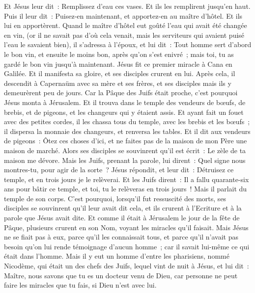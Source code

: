 \begin{multicols}{2}
Et Jésus leur dit~: Remplissez d'eau ces vases. Et ils les remplirent jusqu'en haut.
Puis il leur dit~: Puisez-en maintenant, et apportez-en au maître d'hôtel. Et ils lui en apportèrent.
Quand le maître d'hôtel eut goûté l'eau qui avait été changée en vin, (or il ne savait pas d'où cela venait, mais les serviteurs qui avaient puisé l'eau le savaient bien), il s'adressa à l'époux,
et lui dit~: Tout homme sert d'abord le bon vin, et ensuite le moins bon, après qu'on s'est enivré~; mais toi, tu as gardé le bon vin jusqu'à maintenant.
Jésus fit ce premier miracle à Cana en Galilée. Et il manifesta sa gloire, et ses disciples crurent en lui.
Après cela, il descendit à Capernaüm avec sa mère et ses frères, et ses disciples mais ils y demeurèrent peu de jours.
Car la Pâque des Juifs était proche, c'est pourquoi Jésus monta à Jérusalem.
Et il trouva dans le temple des vendeurs de bœufs, de brebis, et de pigeons, et les changeurs qui y étaient assis.
Et ayant fait un fouet avec des petites cordes, il les chassa tous du temple, avec les brebis et les bœufs~; il dispersa la monnaie des changeurs, et renversa les tables.
Et il dit aux vendeurs de pigeons~: Ôtez ces choses d'ici, et ne faites pas de la maison de mon Père une maison de marché.
Alors ses disciples se souvinrent qu'il est écrit~: Le zèle de ta maison me dévore.
Mais les Juifs, prenant la parole, lui dirent~: Quel signe nous montres-tu, pour agir de la sorte~?
Jésus répondit, et leur dit~: Détruisez ce temple, et en trois jours je le relèverai.
Et les Juifs dirent~: Il a fallu quarante-six ans pour bâtir ce temple, et toi, tu le relèveras en trois jours~!
Mais il parlait du temple de son corps.
C'est pourquoi, lorsqu'il fut ressuscité des morts, ses disciples se souvinrent qu'il leur avait dit cela, et ils crurent à l'Ecriture et à la parole que Jésus avait dite.
Et comme il était à Jérusalem le jour de la fête de Pâque, plusieurs crurent en son Nom, voyant les miracles qu'il faisait.
Mais Jésus ne se fiait pas à eux, parce qu'il les connaissait tous,
et parce qu'il n'avait pas besoin qu'on lui rende témoignage d'aucun homme~; car il savait lui-même ce qui était dans l'homme.
\VerseOne{}Mais il y eut un homme d'entre les pharisiens, nommé Nicodème, qui était un des chefs des Juifs,
lequel vint de nuit à Jésus, et lui dit~: Maître, nous savons que tu es un docteur venu de Dieu, car personne ne peut faire les miracles que tu fais, si Dieu n'est avec lui.

\end{multicols}
